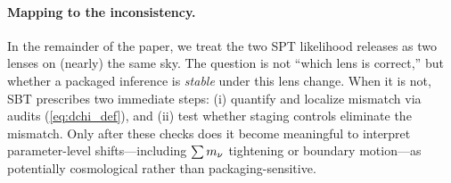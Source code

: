 \paragraph{Mapping to the inconsistency.}
In the remainder of the paper, we treat the two SPT likelihood releases as two lenses on (nearly) the same sky. The question is not ``which lens is correct,'' but whether a packaged inference is \emph{stable} under this lens change. When it is not, SBT prescribes two immediate steps: (i) quantify and localize mismatch via audits (\cref{eq:dchi_def}), and (ii) test whether staging controls eliminate the mismatch. Only after these checks does it become meaningful to interpret parameter-level shifts---including $\sum m_\nu$ tightening or boundary motion---as potentially cosmological rather than packaging-sensitive.
